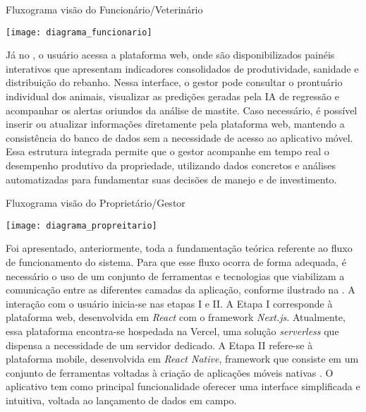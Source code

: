 \begin{flowchart}[!htb]
\centering
\caption{Fluxograma visão do Funcionário/Veterinário}%
\label{fcht:fluxograma1}
\texttt{[image: diagrama\_funcionario]}
\end{flowchart}

Já no , o usuário acessa a plataforma web, onde são disponibilizados painéis interativos que apresentam indicadores consolidados de produtividade, sanidade e distribuição do rebanho. Nessa interface, o gestor pode consultar o prontuário individual dos animais, visualizar as predições geradas pela IA de regressão e acompanhar os alertas oriundos da análise de mastite. Caso necessário, é possível inserir ou atualizar informações diretamente pela plataforma web, mantendo a consistência do banco de dados sem a necessidade de acesso ao aplicativo móvel. Essa estrutura integrada permite que o gestor acompanhe em tempo real o desempenho produtivo da propriedade, utilizando dados concretos e análises automatizadas para fundamentar suas decisões de manejo e de investimento.

\begin{flowchart}[!htb]
\centering
\caption{Fluxograma visão do Proprietário/Gestor}%
\label{fcht:fluxograma2}
\texttt{[image: diagrama\_propreitario]}
\end{flowchart}

Foi apresentado, anteriormente, toda a fundamentação teórica referente ao fluxo de funcionamento do sistema. Para que esse fluxo ocorra de forma adequada, é necessário o uso de um conjunto de ferramentas e tecnologias que viabilizam a comunicação entre as diferentes camadas da aplicação, conforme ilustrado na . A interação com o usuário inicia-se nas etapas I e II. A Etapa I corresponde à plataforma web, desenvolvida em \textit{React} com o framework \textit{Next.js}. Atualmente, essa plataforma encontra-se hospedada na Vercel, uma solução \textit{serverless} que dispensa a necessidade de um servidor dedicado. A Etapa II refere-se à plataforma mobile, desenvolvida em \textit{React Native}, framework que consiste em um conjunto de ferramentas voltadas à criação de aplicações móveis nativas \cite{Bruna2021}. O aplicativo tem como principal funcionalidade oferecer uma interface simplificada e intuitiva, voltada ao lançamento de dados em campo.

